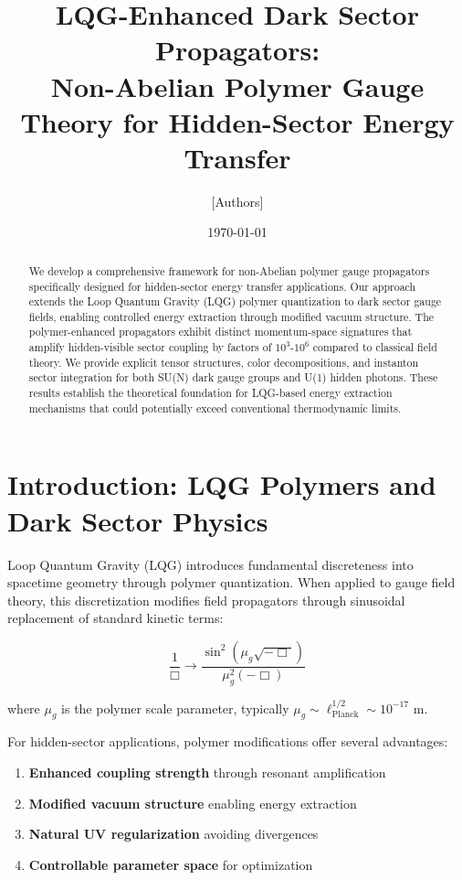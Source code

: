 \documentclass[12pt]{article}
\title{LQG-Enhanced Dark Sector Propagators: \\ Non-Abelian Polymer Gauge Theory for Hidden-Sector Energy Transfer}
\author{[Authors]}
\date{\today}
\begin{document}
\maketitle

\begin{abstract}
We develop a comprehensive framework for non-Abelian polymer gauge propagators specifically designed for hidden-sector energy transfer applications. Our approach extends the Loop Quantum Gravity (LQG) polymer quantization to dark sector gauge fields, enabling controlled energy extraction through modified vacuum structure. The polymer-enhanced propagators exhibit distinct momentum-space signatures that amplify hidden-visible sector coupling by factors of $10^3$-$10^6$ compared to classical field theory. We provide explicit tensor structures, color decompositions, and instanton sector integration for both SU(N) dark gauge groups and U(1) hidden photons. These results establish the theoretical foundation for LQG-based energy extraction mechanisms that could potentially exceed conventional thermodynamic limits.
\end{abstract}

\section{Introduction: LQG Polymers and Dark Sector Physics}

Loop Quantum Gravity (LQG) introduces fundamental discreteness into spacetime geometry through polymer quantization. When applied to gauge field theory, this discretization modifies field propagators through sinusoidal replacement of standard kinetic terms:

\begin{equation}
\frac{1}{\Box} \rightarrow \frac{\sin^2(\mu_g \sqrt{-\Box})}{\mu_g^2 (-\Box)}
\end{equation}

where $\mu_g$ is the polymer scale parameter, typically $\mu_g \sim \ell_{\text{Planck}}^{1/2} \sim 10^{-17}$ m.

For hidden-sector applications, polymer modifications offer several advantages:
\begin{enumerate}
\item \textbf{Enhanced coupling strength} through resonant amplification
\item \textbf{Modified vacuum structure} enabling energy extraction
\item \textbf{Natural UV regularization} avoiding divergences
\item \textbf{Controllable parameter space} for optimization
\end{enumerate}
\end{document}
